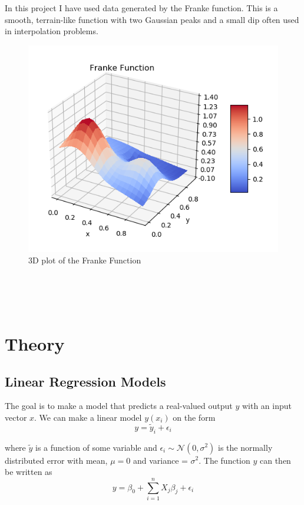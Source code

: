 \documentclass[a4paper,11pt,twocolumn]{article}
\begin{document}
In this project I have used data generated by the Franke function. This is a smooth, terrain-like function with two Gaussian peaks and a small dip often used in interpolation problems.
\begin{figure}[h]
\centering
\includegraphics[scale=0.75]{Franke3}
\caption{3D plot of the Franke Function}
\label{Franke3}
\end{figure}
\\
\\
\\

\section{Theory}

\subsection{Linear Regression Models}

The goal is to make a model that predicts a real-valued output $y$ with an input vector $x$. We can make a linear model $y(x_i)$ on the form 
\begin{equation}
\label{e1}
y=\tilde{y}_i+\epsilon_i
\end{equation}

where $\tilde{y}$ is a function of some variable and  
$\epsilon_i\sim{\mathcal{N}}(0,\sigma^2)$ is the normally distributed error with mean, $\mu=0$ and variance = $\sigma^2$. The function $y$ can then be written as 
\begin{equation}
\label{y1}
y=\beta _0 + \sum\limits_{i=1}^n X_j\beta_j+\epsilon_i
\end{equation}
\end{document}
